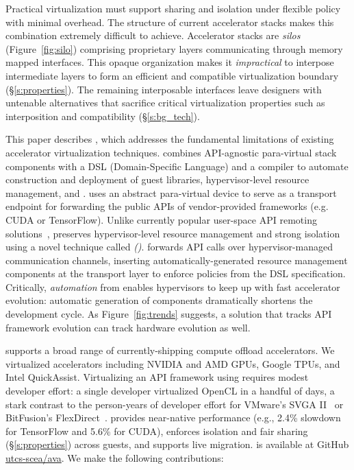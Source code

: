 Practical virtualization must support sharing and isolation under flexible policy
with minimal overhead. The structure of current accelerator stacks makes this
combination extremely difficult to achieve.
Accelerator stacks are \emph{silos} (Figure~\ref{fig:silo})
comprising proprietary layers communicating through memory mapped interfaces.
This opaque organization makes it \emph{impractical} to interpose intermediate layers
to form an efficient and compatible virtualization boundary (\S\ref{s:properties}).
The remaining interposable interfaces leave designers with untenable alternatives
that sacrifice critical virtualization properties such as interposition and compatibility (\S\ref{s:bg_tech}).

This paper describes \Model, which addresses the fundamental limitations of existing accelerator virtualization techniques.
\Model combines API-agnostic para-virtual stack components with a DSL (Domain-Specific Language) and a compiler to automate construction and deployment of guest libraries, hypervisor-level resource management, and \workers.
\Model uses an abstract para-virtual device
to serve as a transport endpoint for forwarding the public APIs of vendor-provided frameworks
(e.g. CUDA or TensorFlow).
Unlike currently popular user-space API remoting solutions~\cite{bitfusion,xaas,vmCUDA,rCUDA,cu2rcu},
\model preserves hypervisor-level resource management and strong isolation
using a novel technique called
\emph{\noveltechnique (\novtechabbrv)}.
\novtechabbrv forwards API calls over hypervisor-managed communication channels,
inserting au\-to\-ma\-tically-generated resource management components at the transport layer
to enforce policies from the DSL specification.
Critically, \emph{automation} from \Model enables hypervisors to keep up with fast accelerator evolution: automatic generation of
components dramatically shortens the development cycle.
As Figure~\ref{fig:trends} suggests, a solution that tracks API framework evolution can track hardware evolution as well.

\Model supports a broad range of currently-shipping
compute offload accelerators.
We virtualized \numaccelerators accelerators including NVIDIA and AMD GPUs,
Google TPUs, and Intel QuickAssist.
Virtualizing an API framework using \model requires modest developer effort:
a single developer virtualized OpenCL in a handful of days,
a stark contrast to the person-years of developer effort for
VMware's SVGA II~\cite{svga} or BitFusion's FlexDirect~\cite{bitfusion}.
\Model provides
near-native performance (e.g., 2.4\% slowdown for TensorFlow and 5.6\% for CUDA),
enforces isolation and fair sharing (\S\ref{s:properties}) across guests,
and supports live migration.
\Model is available at GitHub \mbox{\href{https://github.com/utcs-scea/ava}{utcs-scea/ava}}.
We make the following contributions:

